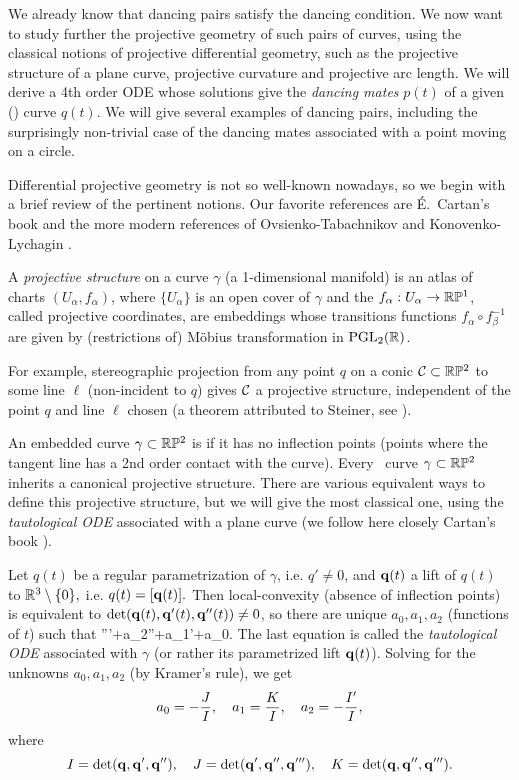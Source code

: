 We already know that dancing pairs  satisfy the dancing condition.  
 We now want to study further the projective geometry of 
such pairs of curves, using the classical notions of projective differential geometry, such as the projective 
structure of a plane curve, projective curvature and projective arc length. We will  derive a 4th 
order ODE whose solutions give the {\em dancing mates} $p(t)$ of a given 
(\lc) curve $q(t)$.  We will give several  examples of dancing pairs, including the surprisingly non-trivial  case of the  dancing mates  
associated with a point moving on a circle. 


 Differential projective geometry  is not so well-known nowadays, so  we  begin with a brief review of the pertinent notions. Our favorite   references are \'E.~Cartan's book \cite{Cbook} and the more modern references of Ovsienko-Tabachnikov \cite{OT} and Konovenko-Lychagin \cite{KL}. 



A {\em projective structure} on a curve $\gamma$ (a 1-dimensional manifold) is an atlas of charts $(U_\alpha, f_\alpha)$, where $\{U_\alpha\}$ is an open cover of $\gamma$ and the $f_\alpha:U_\alpha\to \mathbb{R}\mathbb{P}^1$, called projective coordinates, are embeddings whose transitions functions $f_\alpha\circ f_\beta^{-1}$ are given by (restrictions of) M\"obius transformation in $\rm PGL_2(\mathbb{R})$. 

For example, stereographic projection from any point $q$ on a conic $\mathcal{C}\subset \mathbb{R}\mathbb{P}^2$ to some line $\ell$ (non-incident to $q$) gives $\mathcal{C}$ a projective structure, independent of the point $q$ and line $\ell$ chosen (a theorem attributed to  Steiner, see  \cite[p.~7]{OT}). 


 An embedded  curve $\gamma\subset\mathbb{R}\mathbb{P}^2$  is {\em\lc} if it has no inflection points (points where the tangent line has a 2nd order contact with the curve). Every \lc\  curve $\gamma\subset\mathbb{R}\mathbb{P}^2$ inherits a canonical projective structure. There are various equivalent ways to define this projective structure, but we will give the most classical one, using the {\em tautological ODE} associated with a plane curve (we follow here closely  Cartan's book \cite{Cbook}). 

Let $q(t)$ be a regular parametrization of $\gamma$, i.e. $q'\neq 0$, and $\mathbf q(t)$ a lift of $q(t)$ to $\mathbb{R}^3\setminus \{0\},$ i.e. $q(t)=[\mathbf q(t)].$ Then local-convexity (absence of inflection points) is equivalent to  $\det(\mathbf q(t),\mathbf q'(t),\mathbf q''(t))\neq 0$, so there are unique   $a_0,  a_1, a_2$ 
 (functions of $t$) such that  
%
\be\label{taut}
 \q'''+a_2\q''+a_1\q'+a_0.
 \ee
The last equation is  called the {\em tautological ODE} associated with $\gamma$ (or rather  its parametrized lift $\mathbf q(t)$). Solving   for  the unknowns $a_0,  a_1, a_2$ (by Kramer's rule), we get  
$$
a_0=-{J\over I},\quad
a_1={K\over I},\quad
a_2=-{I'\over I},
$$
where
$$I=\det(\mathbf q,\mathbf q', \mathbf q''), \quad J=\det(\mathbf q',\mathbf q'',\mathbf q'''), \quad 
K=\det(\mathbf q, \mathbf q'', \mathbf q''') .
$$

